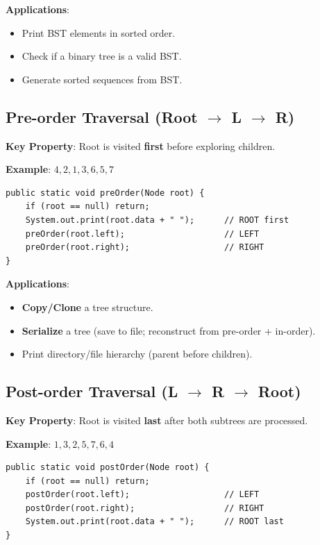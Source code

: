 \documentclass[12pt,a4paper]{article}
\begin{document}
\textbf{Applications}:
\begin{itemize}
    \item Print BST elements in sorted order.
    \item Check if a binary tree is a valid BST.
    \item Generate sorted sequences from BST.
\end{itemize}

\subsection{Pre-order Traversal (Root $\to$ L $\to$ R)}

\textbf{Key Property}: Root is visited \textbf{first} before exploring children.

\textbf{Example}: $4, 2, 1, 3, 6, 5, 7$

\begin{lstlisting}[style=javastyle, caption={Pre-order Traversal — Java}]
public static void preOrder(Node root) {
    if (root == null) return;
    System.out.print(root.data + " ");      // ROOT first
    preOrder(root.left);                    // LEFT
    preOrder(root.right);                   // RIGHT
}
\end{lstlisting}

\textbf{Applications}:
\begin{itemize}
    \item \textbf{Copy/Clone} a tree structure.
    \item \textbf{Serialize} a tree (save to file; reconstruct from pre-order + in-order).
    \item Print directory/file hierarchy (parent before children).
\end{itemize}

\subsection{Post-order Traversal (L $\to$ R $\to$ Root)}

\textbf{Key Property}: Root is visited \textbf{last} after both subtrees are processed.

\textbf{Example}: $1, 3, 2, 5, 7, 6, 4$

\begin{lstlisting}[style=javastyle, caption={Post-order Traversal — Java}]
public static void postOrder(Node root) {
    if (root == null) return;
    postOrder(root.left);                   // LEFT
    postOrder(root.right);                  // RIGHT
    System.out.print(root.data + " ");      // ROOT last
}
\end{lstlisting}
\end{document}

